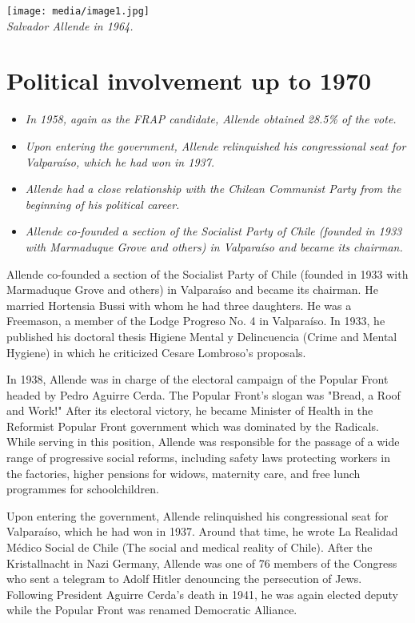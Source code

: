 \texttt{[image: media/image1.jpg]}\\
\emph{Salvador Allende in 1964.}

\section{Political involvement up to
1970}\label{political-involvement-up-to-1970}

\begin{itemize}
\item
  \emph{In 1958, again as the FRAP candidate, Allende obtained 28.5\% of
  the vote.}
\item
  \emph{Upon entering the government, Allende relinquished his
  congressional seat for Valparaíso, which he had won in 1937.}
\item
  \emph{Allende had a close relationship with the Chilean Communist
  Party from the beginning of his political career.}
\item
  \emph{Allende co-founded a section of the Socialist Party of Chile
  (founded in 1933 with Marmaduque Grove and others) in Valparaíso and
  became its chairman.}
\end{itemize}

Allende co-founded a section of the Socialist Party of Chile (founded in
1933 with Marmaduque Grove and others) in Valparaíso and became its
chairman. He married Hortensia Bussi with whom he had three daughters.
He was a Freemason, a member of the Lodge Progreso No. 4 in Valparaíso.
In 1933, he published his doctoral thesis Higiene Mental y Delincuencia
(Crime and Mental Hygiene) in which he criticized Cesare Lombroso's
proposals.

In 1938, Allende was in charge of the electoral campaign of the Popular
Front headed by Pedro Aguirre Cerda. The Popular Front's slogan was
"Bread, a Roof and Work!" After its electoral victory, he became
Minister of Health in the Reformist Popular Front government which was
dominated by the Radicals. While serving in this position, Allende was
responsible for the passage of a wide range of progressive social
reforms, including safety laws protecting workers in the factories,
higher pensions for widows, maternity care, and free lunch programmes
for schoolchildren.

Upon entering the government, Allende relinquished his congressional
seat for Valparaíso, which he had won in 1937. Around that time, he
wrote La Realidad Médico Social de Chile (The social and medical reality
of Chile). After the Kristallnacht in Nazi Germany, Allende was one of
76 members of the Congress who sent a telegram to Adolf Hitler
denouncing the persecution of Jews. Following President Aguirre Cerda's
death in 1941, he was again elected deputy while the Popular Front was
renamed Democratic Alliance.

